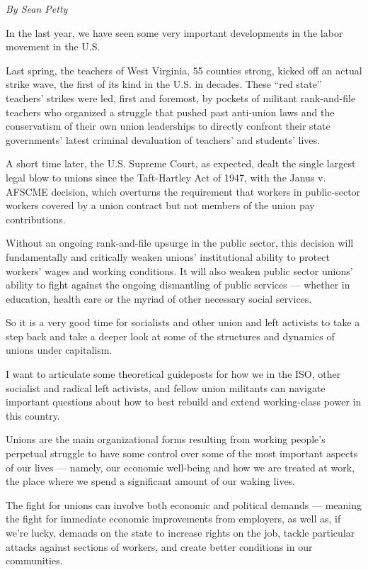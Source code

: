 \emph{By Sean Petty}

In the last year, we have seen some very important developments in the labor movement in the U.S.

Last spring, the teachers of West Virginia, 55 counties strong, kicked off an actual strike wave, the first of its kind in the U.S. in decades. These “red state” teachers’ strikes were led, first and foremost, by pockets of militant rank-and-file teachers who organized a struggle that pushed past anti-union laws and the conservatism of their own union leaderships to directly confront their state governments’ latest criminal devaluation of teachers’ and students’ lives.

A short time later, the U.S. Supreme Court, as expected, dealt the single largest legal blow to unions since the Taft-Hartley Act of 1947, with the Janus v. AFSCME decision, which overturns the requirement that workers in public-sector workers covered by a union contract but not members of the union pay contributions.

Without an ongoing rank-and-file upsurge in the public sector, this decision will fundamentally and critically weaken unions’ institutional ability to protect workers’ wages and working conditions. It will also weaken public sector unions’ ability to fight against the ongoing dismantling of public services — whether in education, health care or the myriad of other necessary social services.

So it is a very good time for socialists and other union and left activists to take a step back and take a deeper look at some of the structures and dynamics of unions under capitalism.

I want to articulate some theoretical guideposts for how we in the ISO, other socialist and radical left activists, and fellow union militants can navigate important questions about how to best rebuild and extend working-class power in this country.

\sectiondivider

Unions are the main organizational forms resulting from working people’s perpetual struggle to have some control over some of the most important aspects of our lives — namely, our economic well-being and how we are treated at work, the place where we spend a significant amount of our waking lives.

The fight for unions can involve both economic and political demands — meaning the fight for immediate economic improvements from employers, as well as, if we’re lucky, demands on the state to increase rights on the job, tackle particular attacks against sections of workers, and create better conditions in our communities.

